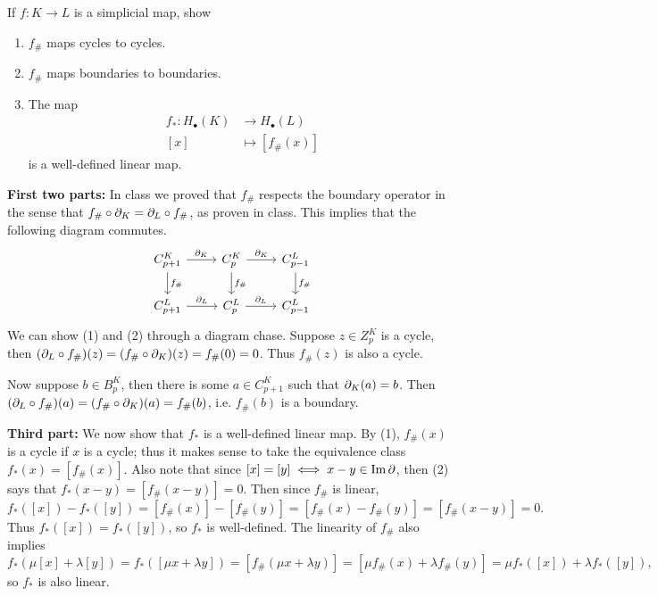 \documentclass[twoside,10pt]{article}
\begin{document}

\begin{exer}
	If $f:K\to L$ is a simplicial map, show
	\begin{enumerate}
		\item $f_{\#}$ maps cycles to cycles.
		\item $f_{\#}$ maps boundaries to boundaries.
		\item The map
			\begin{align*}
				f_{*}:H_{\bullet}(K) &\to H_{\bullet}(L) \\
				[x] &\mapsto [f_{\#}(x)]
			\end{align*}
			is a well-defined linear map.
	\end{enumerate}
\end{exer}

\textbf{First two parts:} 
In class we proved that $f_{\#}$ respects the boundary operator in the sense that $f_{\#}\circ \partial_{K} = \partial_{L} \circ f_{\#}$, as proven in class. This implies that the following diagram commutes.
\[
	\begin{tikzcd}
		C_{p+1}^{K} \rar{\p_{K}} \dar{f_{\#}} & C_{p}^{K} \rar{\p_{K}} \dar{f_{\#}} & C_{p-1}^{L} \dar{f_{\#}} \\
		C_{p+1}^{L} \rar{\p_{L}} & C_{p}^{L} \rar{\p_{L}} & C_{p-1}^{L}
	\end{tikzcd}
\] We can show (1) and (2) through a diagram chase. Suppose $z \in Z_{p}^{K}$ is a cycle, then $(\partial_{L}\circ f_{\#})(z) = (f_{\#} \circ \partial_{K})(z) = f_{\#}(0) = 0$. Thus $f_{\#}(z)$ is also a cycle.

Now suppose $b \in B_{p}^{K}$, then there is some $a \in C_{p+1}^{K}$ such that $\partial_{K}(a) = b$. Then $(\partial_{L} \circ f_{\#})(a) = (f_{\#}\circ \partial_{K})(a) = f_{\#}(b)$, i.e. $f_{\#}(b)$ is a boundary.

\textbf{Third part:} 
We now show that $f_{*}$ is a well-defined linear map. By (1), $f_{\#}(x)$ is a cycle if $x$ is a cycle; thus it makes sense to take the equivalence class $f_{*}(x) = [f_{\#}(x)]$. Also note that since $[x]=[y] \iff x-y \in \operatorname{Im}  \partial$, then (2) says that $f_{*}(x-y) = [f_{\#}(x-y)] = 0$. Then since $f_{\#}$ is linear,
\[
	f_{*}([x]) - f_{*}([y]) = [f_{\#}(x)] - [f_{\#}(y)] = [f_{\#}(x)-f_{\#}(y)] = [f_{\#}(x-y)] = 0.
\] Thus $f_{*}([x]) = f_{*}([y])$, so $f_{*}$ is well-defined. The linearity of $f_{\#}$ also implies
\[
	f_{*}(\mu[x]+\lambda[y]) = f_{*}([\mu x+\lambda y]) = [f_{\#}(\mu x + \lambda y)] = [\mu f_{\#}(x) + \lambda f_{\#}(y)] = \mu f_{*}([x]) + \lambda f_{*}([y]),
\] so $f_{*}$ is also linear.
\end{document}
